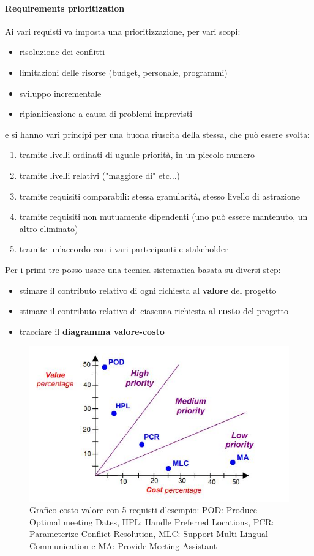 \documentclass[a4paper,12pt, oneside]{book}
\begin{document}
\paragraph{Requirements prioritization}
Ai vari requisti va imposta una prioritizzazione, per vari scopi:
\begin{itemize}
  \item risoluzione dei conflitti 
  \item limitazioni delle risorse (budget, personale, programmi) 
  \item sviluppo incrementale 
  \item ripianificazione a causa di problemi imprevisti
\end{itemize}
e si hanno vari principi per una buona riuscita della stessa, che può essere
svolta: 
\begin{enumerate}
  \item tramite livelli ordinati di uguale priorità, in un piccolo numero 
  \item tramite livelli relativi ("maggiore di" etc$\ldots$) 
  \item tramite requisiti comparabili: stessa granularità, stesso livello di
  astrazione  
  \item tramite requisiti non mutuamente dipendenti (uno può essere mantenuto,
  un altro eliminato) 
  \item tramite un'accordo con i vari partecipanti e stakeholder
\end{enumerate}
Per i primi tre posso usare una tecnica sistematica basata su diversi step:
\begin{itemize}
  \item stimare il contributo relativo di ogni richiesta al \textbf{valore} del
  progetto 
  \item stimare il contributo relativo di ciascuna richiesta al \textbf{costo}
  del progetto 
  \item tracciare il \textbf{diagramma valore-costo}
\end{itemize}
\begin{figure}
  \centering
  \includegraphics[scale = 0.6]{img/re6.jpg}
  \caption{Grafico costo-valore con 5 requisti d'esempio:
    POD:  Produce Optimal meeting Dates,
    HPL: Handle Preferred Locations,
    PCR: Parameterize Conflict Resolution,
    MLC: Support Multi-Lingual Communication e
    MA:  Provide Meeting Assistant}
\end{figure}
\end{document}
